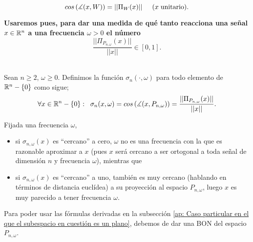 \begin{equation}
\label{eq1: 20Mar}
cos \left( \measuredangle (x, W) \right) = || \Pi_{W}(x) || 
\hspace{0.5cm} (x \hspace{0.1cm} \text{unitario).}
\end{equation}


\textbf{Usaremos pues, para dar una medida de qué tanto
reacciona una señal $x \in \mathbb{R}^{n}$ a una frecuencia
$\omega >0$
el número 
\[\frac{||\Pi_{P_{n, \omega}}(x)||}{||x||} \in [0,1].\]} \\

\begin{defi}
\label{def: final de sigmas}
Sean $n \geq 2$, $\omega \geq 0$. 
Definimos la función $\sigma_{n}(\cdot, \omega)$ para todo 
elemento de $\mathbb{R}^{n} - \{ 0\}$
como sigue;
\begin{equation}
\label{eq: def sigmas}
	\forall x \in \mathbb{R}^{n}-\{ 0\}: \hspace{0.2cm}
	\sigma_{n}(x, \omega) =
	cos \left( \measuredangle (x, P_{n, \omega}) \right) = 
	\frac{||\Pi_{P_{n, \omega}}(x)||}{||x||} .
\end{equation}
\end{defi}

\begin{nota}
\label{nota: significado de los sigma en AE}
Fijada una frecuencia $\omega$, 
\begin{itemize}
\item si $\sigma_{n, \omega}(x)$ es ``cercano'' a cero, $\omega$ no
es una frecuencia con la que es razonable aproximar a $x$ (pues $x$ será
cercano a ser ortogonal a toda señal de dimensión $n$ y frecuencia 
$\omega$),  mientras que

\item si $\sigma_{n, \omega}(x)$ es ``cercano'' a uno, también es muy cercano
(hablando en términos de distancia euclídea) a su proyección al espacio
$P_{n, \omega}$, luego $x$ es muy parecido a tener frecuencia $\omega$.
\end{itemize}
\end{nota}



Para poder usar las fórmulas
derivadas en la subsección 
\ref{ap: Caso particular en el que el subespacio en cuestión es un plano},
debemos de dar una BON del espacio $P_{n, \omega}$.

